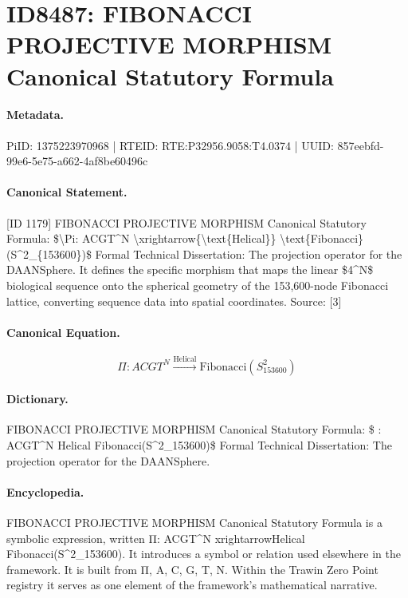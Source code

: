\section*{ID8487: FIBONACCI PROJECTIVE MORPHISM Canonical Statutory Formula}
\paragraph{Metadata.}
PiID: 1375223970968 | RTEID: RTE:P32956.9058:T4.0374 | UUID: 857eebfd-99e6-5e75-a662-4af8be60496c

\paragraph{Canonical Statement.}
[ID 1179] FIBONACCI PROJECTIVE MORPHISM Canonical Statutory Formula: \$\textbackslash{}Pi: ACGT\textasciicircum{}N \textbackslash{}xrightarrow\{\textbackslash{}text\{Helical\}\} \textbackslash{}text\{Fibonacci\}(S\textasciicircum{}2\_\{153600\})\$ Formal Technical Dissertation: The projection operator for the DAANSphere. It defines the specific morphism that maps the linear \$4\textasciicircum{}N\$ biological sequence onto the spherical geometry of the 153,600-node Fibonacci lattice, converting sequence data into spatial coordinates. Source: [3]

\paragraph{Canonical Equation.}
\[
\Pi: ACGT^N \xrightarrow{\text{Helical}} \text{Fibonacci}(S^2_{153600})
\]

\paragraph{Dictionary.}
FIBONACCI PROJECTIVE MORPHISM Canonical Statutory Formula: \$ : ACGT\textasciicircum{}N Helical Fibonacci(S\textasciicircum{}2\_153600)\$ Formal Technical Dissertation: The projection operator for the DAANSphere.

\paragraph{Encyclopedia.}
FIBONACCI PROJECTIVE MORPHISM Canonical Statutory Formula is a symbolic expression, written Π: ACGT\textasciicircum{}N xrightarrowHelical Fibonacci(S\textasciicircum{}2\_153600). It introduces a symbol or relation used elsewhere in the framework. It is built from Π, A, C, G, T, N. Within the Trawin Zero Point registry it serves as one element of the framework's mathematical narrative.
